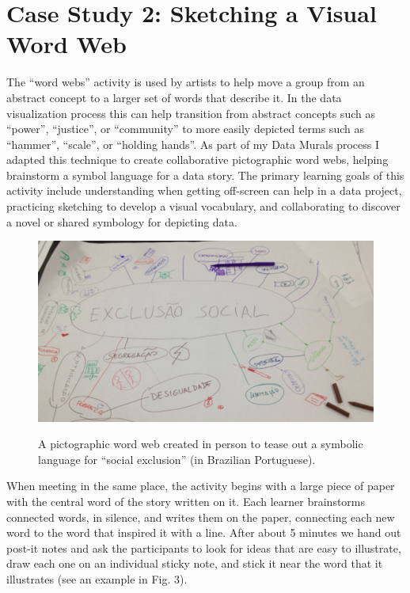 \documentclass[journal]{vgtc}                %
\begin{document}
\section{Case Study 2: Sketching a Visual Word Web}
The “word webs” activity is used by artists to help move a group from an abstract concept to a larger set of words that describe it. In the data visualization process this can help transition from abstract concepts such as “power”, “justice”, or “community” to more easily depicted terms such as “hammer”, “scale”, or “holding hands”. As part of my Data Murals process I adapted this technique to create collaborative pictographic word webs, helping brainstorm a symbol language for a data story\cite{bhargava_data_2016}. The primary learning goals of this activity include understanding when getting off-screen can help in a data project, practicing sketching to develop a visual vocabulary, and collaborating to discover a novel or shared symbology for depicting data.

\begin{figure}[h]
  \centering
  \includegraphics[scale=0.29]{figures/word-web-paper.jpg}
  \label{fig:word_web_paper}
  \setlength{\abovecaptionskip}{-1pt}
  \caption{A pictographic word web created in person to tease out a symbolic language for “social exclusion” (in Brazilian Portuguese).}
\end{figure}

When meeting in the same place, the activity begins with a large piece of paper with the central word of the story written on it. Each learner brainstorms connected words, in silence, and writes them on the paper, connecting each new word to the word that inspired it with a line. After about 5 minutes we hand out post-it notes and ask the participants to look for ideas that are easy to illustrate, draw each one on an individual sticky note, and stick it near the word that it illustrates (see an example in Fig. 3).
\end{document}
